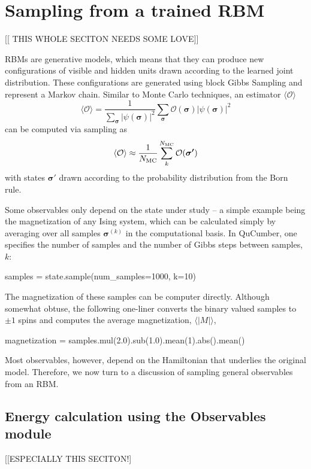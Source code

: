 \documentclass[submission, Phys]{SciPost}
\begin{document}
\section{Sampling from a trained RBM}
\label{Sec:Sampling_a-Trained_RBM}

[[ THIS WHOLE SECITON NEEDS SOME LOVE]]

RBMs are generative models, which means that they can produce new configurations of visible and hidden units
drawn according to the learned joint distribution.
These configurations are generated using block Gibbs Sampling and represent a Markov chain. Similar to Monte Carlo techniques, an estimator $\langle \mathcal{O} \rangle$ 
$$
\langle \mathcal{O} \rangle = \frac{1}{\sum_{\bm{\sigma}} |\psi(\bm{\sigma})|^2}
\sum_{\bm{\sigma}}  \mathcal{O}(\bm{\sigma}) |\psi(\bm{\sigma})|^2
$$
can be computed via sampling as 
$$
\langle \mathcal{O}\rangle \approx \frac{1}{N_{\rm MC}} \sum_k^{N_{\rm MC}}  \mathcal{O} (\bm{\sigma'})
$$
with states $ \bm{\sigma'}$ drawn according to the probability distribution from the Born rule.

Some observables only depend on the state under study -- a simple example being the magnetization of any Ising 
system, which can be calculated simply by averaging over all samples $\bm{\sigma}^{(k)}$ in the computational basis.
In QuCumber, one specifies the number of samples and the number of Gibbs steps between samples, $k$:
\begin{python}
samples = state.sample(num_samples=1000, k=10)
\end{python}

The magnetization of these samples can be computer directly. Although somewhat obtuse, the following one-liner converts the binary valued samples to $\pm 1$ spins and computes the average magnetization, $\langle |M|\rangle$,
\begin{python}
magnetization = samples.mul(2.0).sub(1.0).mean(1).abs().mean()
\end{python}

Most observables, however, depend on the Hamiltonian that underlies the original model.
Therefore, we now turn to a discussion of sampling general observables from an RBM.


\subsection{Energy calculation using the Observables module}
[[ESPECIALLY THIS SECITON!] 
\end{document}

